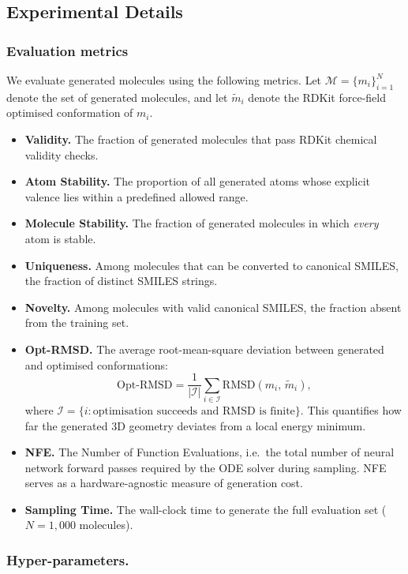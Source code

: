 \documentclass{article}
\theoremstyle{plain}
\theoremstyle{definition}
\theoremstyle{remark}
\newcommand{\1}{\mathbf{1}}
\begin{document}
\subsection{Experimental Details}

\subsubsection{Evaluation metrics}

We evaluate generated molecules using the following metrics. Let $\mathcal{M} = \{m_i\}_{i=1}^N$ denote the set of generated molecules, and let $\tilde{m}_i$ denote the RDKit force-field optimised conformation of $m_i$.
\begin{itemize}
    \item \textbf{Validity.} The fraction of generated molecules that pass RDKit chemical validity checks.
    \item \textbf{Atom Stability.} The proportion of all generated atoms whose explicit valence lies within a predefined allowed range.
    \item \textbf{Molecule Stability.} The fraction of generated molecules in which \emph{every} atom is stable.
    \item \textbf{Uniqueness.} Among molecules that can be converted to canonical SMILES, the fraction of distinct SMILES strings.
    \item \textbf{Novelty.} Among molecules with valid canonical SMILES, the fraction absent from the training set.
    \item \textbf{Opt-RMSD.} The average root-mean-square deviation between generated and optimised conformations:
    \[
\text{Opt-RMSD}
= \frac{1}{|\mathcal{I}|}
  \sum_{i \in \mathcal{I}} \mathrm{RMSD}(m_i,\, \tilde{m}_i),
\]
where $\mathcal{I} = \{i : \text{optimisation succeeds and RMSD is finite}\}$.
This quantifies how far the generated 3D geometry deviates from a local energy minimum.
    \item \textbf{NFE.} The Number of Function Evaluations, i.e.\ the total number of neural network forward passes required by the ODE solver during sampling. NFE serves as a hardware-agnostic measure of generation cost.
    \item \textbf{Sampling Time.} The wall-clock time to generate the full evaluation set ($N{=}1{,}000$ molecules).
\end{itemize}


\subsubsection{Hyper-parameters.}
\end{document}
